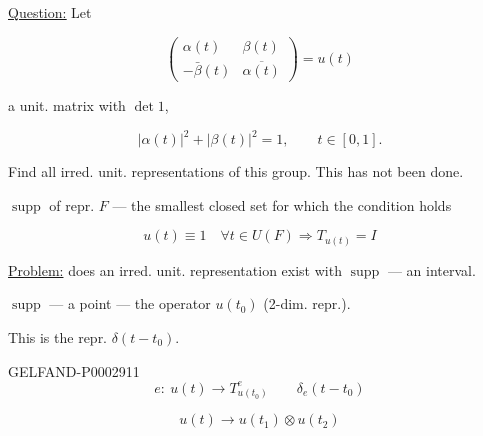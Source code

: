 \underline{\underline{Question:}} Let

\begin{equation*}
\begin{pmatrix}\alpha (t)&\beta (t)\\-\bar\beta (t)&\overline{\alpha (t)}\end{pmatrix}=u (t)
\end{equation*}

a unit. matrix with $\det1$,

\begin{equation*}|\alpha (t)|^2+|\beta (t)|^2=1,\qquad t\in[0,1].\end{equation*}

Find all irred. unit. representations of this group. This has not been done.

$\operatorname{supp}$ of repr. $F$ --- the smallest closed set for which the condition holds

\begin{equation*}u (t)\equiv1\quad\forall t\in U (F)\Longrightarrow T_{u (t)}=I\end{equation*}

\underline{Problem:} does an irred. unit. representation exist with $\operatorname{supp}$ --- an interval.

\begin{center}\end{center}

$\operatorname{supp}$ --- a point --- the operator $u (t_0)$ (2-dim. repr.).

This is the repr. $\delta (t-t_0)$.

\begin{GelfandAdjacentEvidence}{GELFAND-P000291}{1}
\begin{equation*}e:\ u (t)\longrightarrow T^e_{u (t_0)}\qquad\delta_e (t-t_0)\end{equation*}

\end{GelfandAdjacentEvidence}


\begin{equation*}u (t)\longrightarrow u (t_1)\otimes u (t_2)\end{equation*}

